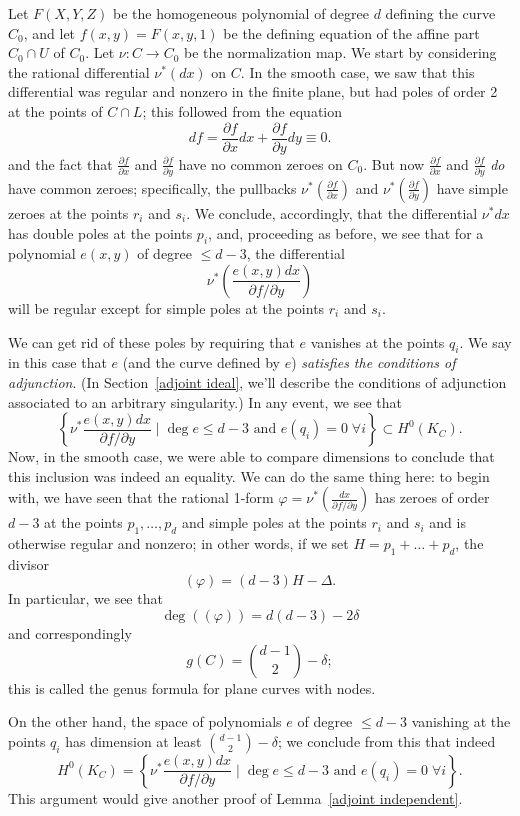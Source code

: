 Let $F(X,Y,Z)$ be the homogeneous polynomial of degree $d$ defining the curve $C_0$, and let $f(x,y) = F(x,y,1)$ be the defining equation of the affine part $C_0 \cap U$ of $C_0$. Let $\nu: C\to C_0$ be the normalization map. We start by considering the rational differential $\nu^*(dx)$ on $C$. In the smooth case, we saw that this differential was regular and nonzero in the finite plane, but had poles of order 2 at the points of $C \cap L$; this followed from the equation
$$
 df = \frac{\partial f}{\partial x}dx + \frac{\partial f}{\partial y}dy \equiv 0.
 $$
and the fact that $\frac{\partial f}{\partial x}$ and $\frac{\partial f}{\partial y}$ have no common zeroes on $C_0$. But now $\frac{\partial f}{\partial x}$ and $\frac{\partial f}{\partial y}$ \emph{do} have common zeroes; specifically, the pullbacks $\nu^*(\frac{\partial f}{\partial x})$ and $\nu^*(\frac{\partial f}{\partial y})$ have simple zeroes at the points $r_i$ and $s_i$. We conclude, accordingly, that the differential $\nu^*dx$ has double poles at the points $p_i$, 
and, proceeding as before, we see that for a polynomial $e(x,y)$ of degree $\leq d-3$, the differential
$$
\nu^*( \frac{e(x,y)dx}{\partial f/\partial y})
$$
will be regular except for simple poles at the points $r_i$ and $s_i$.

We can get rid of these poles by requiring that $e$ vanishes at the points $q_i$. We say in this case that $e$ (and the curve defined by $e$) \emph{satisfies the conditions of adjunction}. (In Section~\ref{adjoint ideal}, we'll describe the  conditions of adjunction associated to an arbitrary singularity.) In any event, we see that
$$
 \left\{ \nu^* \frac{e(x,y)dx}{\partial f/\partial y} \mid \deg e \leq d-3 \text{ and } e(q_i) = 0 \; \forall i \right\} \subset H^0(K_C).
$$
Now, in the smooth case, we were able to compare dimensions to conclude that this inclusion was indeed an equality. We can do the same thing here: to begin with, we have seen that the  rational 1-form $\varphi = \nu^*(\frac{dx}{\partial f/\partial y})$ has zeroes of order $d-3$ at the points $p_1,\dots,p_d$ and simple poles at the points $r_i$ and $s_i$ and is otherwise regular and nonzero; in other words, if we set $H = p_1+\dots + p_d$, the divisor
$$
(\varphi) = (d-3)H - \Delta.
$$
In particular, we see that
$$
\deg((\varphi)) = d(d-3) - 2\delta
$$
and correspondingly
$$
g(C) = \binom{d-1}{2} - \delta;
$$
this is called the genus formula for plane curves with nodes.

On the other hand, the space of polynomials $e$ of degree $\leq d-3$ vanishing at the points $q_i$ has dimension at least $ \binom{d-1}{2} - \delta$; we conclude from this that indeed
$$
H^0(K_C) =  \left\{ \nu^* \frac{e(x,y)dx}{\partial f/\partial y} \mid \deg e \leq d-3 \text{ and } e(q_i) = 0 \; \forall i \right\}.
$$
This argument would give another proof of Lemma~\ref{adjoint independent}.


